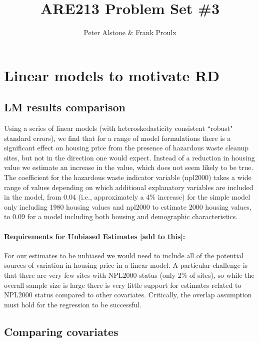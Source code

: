 \documentclass[letterpaper, 12pt]{article}
\begin{document}
\title{ARE213 Problem Set \#3}
\author{Peter Alstone \& Frank Proulx}
\maketitle

\section{Linear models to motivate RD}

\subsection{LM results comparison}



Using a series of linear models (with heteroskedasticity consistent ``robust" standard errors), we find that for a range of model formulations there is a significant effect on housing price from the presence of hazardous waste cleanup sites, but not in the direction one would expect.  Instead of a reduction in housing value we estimate an increase in the value, which does not seem likely to be true.  The coefficient for the hazardous waste indicator variable (npl2000) takes a wide range of values depending on which additional explanatory variables are included in the model, from 0.04 (i.e., approximately a 4\% increase) for the simple model only including 1980 housing values and npl2000 to estimate 2000 housing values, to 0.09 for a model including both housing and demographic characteristics.  

\paragraph{Requirements for Unbiased Estimates [add to this]:}For our estimates to be unbiased we would need to include all of the potential sources of variation in housing price in a linear model.  A particular challenge is that there are very few sites with NPL2000 status (only 2\% of sites), so while the overall sample size is large there is very little support for estimates related to NPL2000 status compared to other covariates.  Critically, the overlap assumption must hold for the regression to be successful.  

\subsection{Comparing covariates}
\end{document}
